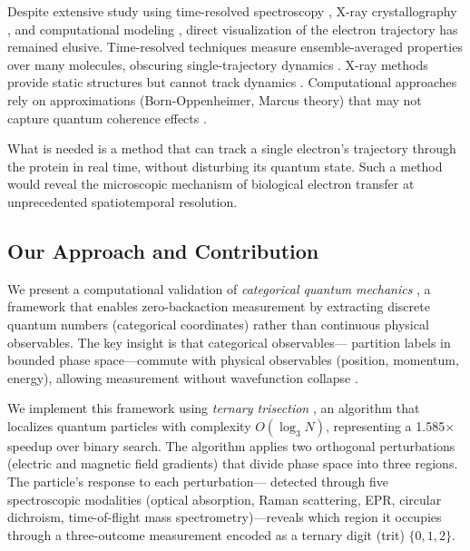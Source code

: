 \documentclass[twocolumn,10pt]{article}
\begin{document}
Despite extensive study using time-resolved spectroscopy \cite{Winkler1997, 
Gray2005}, X-ray crystallography \cite{Nar1991}, and computational modeling 
\cite{Beratan1992, Skourtis2010}, direct visualization of the electron trajectory 
has remained elusive. Time-resolved techniques measure ensemble-averaged 
properties over many molecules, obscuring single-trajectory dynamics 
\cite{Zewail2000}. X-ray methods provide static structures but cannot track 
dynamics \cite{Neutze2000}. Computational approaches rely on approximations 
(Born-Oppenheimer, Marcus theory) that may not capture quantum coherence effects 
\cite{Prytkova2007}.

What is needed is a method that can track a single electron's trajectory through 
the protein in real time, without disturbing its quantum state. Such a method 
would reveal the microscopic mechanism of biological electron transfer at 
unprecedented spatiotemporal resolution.


\subsection{Our Approach and Contribution}

We present a computational validation of \textit{categorical quantum mechanics} 
\cite{Sachikonye2026a}, a framework that enables zero-backaction measurement by 
extracting discrete quantum numbers (categorical coordinates) rather than 
continuous physical observables. The key insight is that categorical observables—
partition labels in bounded phase space—commute with physical observables 
(position, momentum, energy), allowing measurement without wavefunction collapse 
\cite{Sachikonye2026b}.

We implement this framework using \textit{ternary trisection} \cite{Sachikonye2026c}, 
an algorithm that localizes quantum particles with complexity $O(\log_3 N)$, 
representing a 1.585$\times$ speedup over binary search. The algorithm applies 
two orthogonal perturbations (electric and magnetic field gradients) that divide 
phase space into three regions. The particle's response to each perturbation—
detected through five spectroscopic modalities (optical absorption, Raman 
scattering, EPR, circular dichroism, time-of-flight mass spectrometry)—reveals 
which region it occupies through a three-outcome measurement encoded as a 
ternary digit (trit) $\{0, 1, 2\}$.
\end{document}
